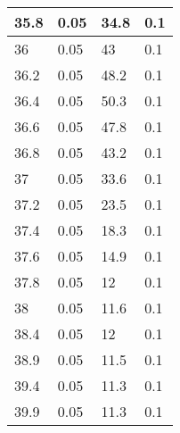 \begin{table}[]
\begin{tabular}{|l|l|l|l|}
35.8            & 0.05       & 34.8        & 0.1       \\ \hline
36              & 0.05       & 43          & 0.1       \\ \hline
36.2            & 0.05       & 48.2        & 0.1       \\ \hline
36.4            & 0.05       & 50.3        & 0.1       \\ \hline
36.6            & 0.05       & 47.8        & 0.1       \\ \hline
36.8            & 0.05       & 43.2        & 0.1       \\ \hline
37              & 0.05       & 33.6        & 0.1       \\ \hline
37.2            & 0.05       & 23.5        & 0.1       \\ \hline
37.4            & 0.05       & 18.3        & 0.1       \\ \hline
37.6            & 0.05       & 14.9        & 0.1       \\ \hline
37.8            & 0.05       & 12          & 0.1       \\ \hline
38              & 0.05       & 11.6        & 0.1       \\ \hline
38.4            & 0.05       & 12          & 0.1       \\ \hline
38.9            & 0.05       & 11.5        & 0.1       \\ \hline
39.4            & 0.05       & 11.3        & 0.1       \\ \hline
39.9            & 0.05       & 11.3        & 0.1       \\ \hline
\end{tabular}
\end{table}